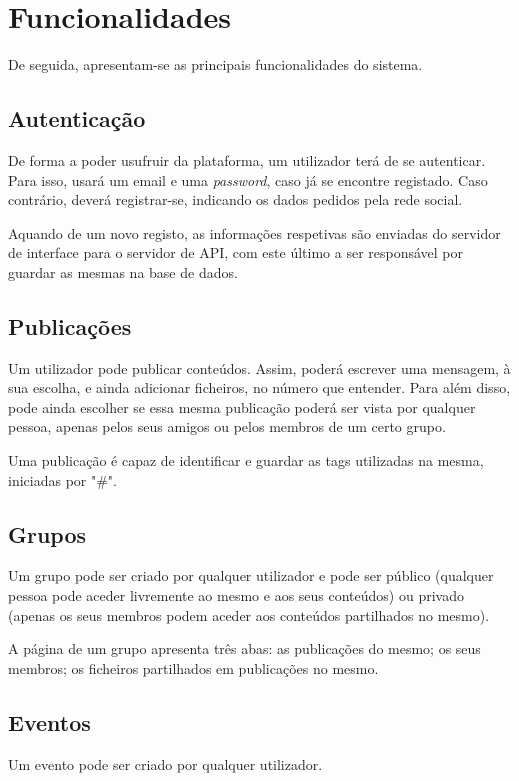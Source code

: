 \documentclass[a4paper]{report}
\begin{document}
	\section{Funcionalidades}
    De seguida, apresentam-se as principais funcionalidades do sistema.
	
	\subsection{Autenticação}
    De forma a poder usufruir da plataforma, um utilizador terá de se autenticar. Para isso, usará um email e uma \textit{password}, caso já se encontre registado.
    Caso contrário, deverá registrar-se, indicando os dados pedidos pela rede social.

    Aquando de um novo registo, as informações respetivas são enviadas do servidor de interface para o servidor de API, com este último a ser responsável por guardar as mesmas na base de dados.


	\subsection{Publicações}
    Um utilizador pode publicar conteúdos. Assim, poderá escrever uma mensagem, à sua escolha, e ainda adicionar ficheiros, no número que entender. 
    Para além disso, pode ainda escolher se essa mesma publicação poderá ser vista por qualquer pessoa, apenas pelos seus amigos ou pelos membros de um certo grupo.

    Uma publicação é capaz de identificar e guardar as tags utilizadas na mesma, iniciadas por "\#".


    \subsection{Grupos}
    Um grupo pode ser criado por qualquer utilizador e pode ser público (qualquer pessoa pode aceder livremente ao mesmo e aos seus conteúdos) ou privado (apenas os seus membros podem aceder aos conteúdos partilhados no mesmo).

    A página de um grupo apresenta três abas: as publicações do mesmo; os seus membros; os ficheiros partilhados em publicações no mesmo.


    \subsection{Eventos}
    Um evento pode ser criado por qualquer utilizador.
\end{document}
